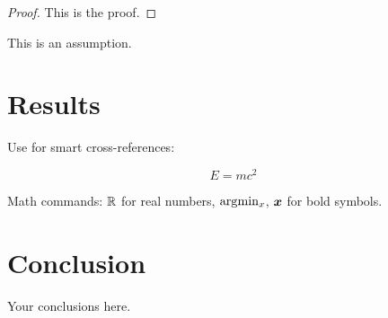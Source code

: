 \documentclass[12pt, colorlinks, doublespace]{bp-article}
\begin{document}
\begin{proof}
This is the proof.
\end{proof}

\begin{assumption}
This is an assumption.
\end{assumption}

\section{Results}

Use  for smart cross-references:

\begin{equation}
    E = mc^2
    \label{eq:sample}
\end{equation}

Math commands: $\mathbb{R}$ for real numbers, $\arg\!\min_{x}$, $\boldsymbol{x}$ for bold symbols.

\section{Conclusion}

Your conclusions here.


% 
% 


\end{document}
